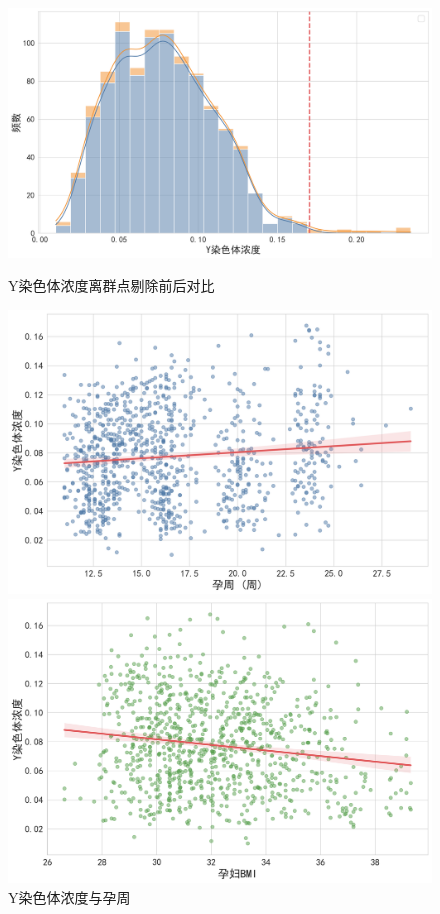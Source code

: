 \begin{figure}[h!]
	\centering
	\begin{minipage}[b]{0.48\textwidth}
		\centering
		\includegraphics[width=1\textwidth]{figs/3问题一/图1_Y浓度离群点剔除可视化.png}
		\caption{Y染色体浓度离群点剔除前后对比}
		\label{fig:Y浓度离群点剔除可视化}
	\end{minipage}
	\hfill
	\begin{minipage}[b]{0.48\textwidth}
		\centering
		\includegraphics[width=\textwidth]{figs/3问题一/图3_Y浓度_vs_孕周_散点图.png}
		\caption{Y染色体浓度与孕周}
		\label{fig:Y浓度_vs_孕周_散点图}
	\end{minipage}
	\hfill
	\begin{minipage}[b]{0.48\textwidth}
		\centering
		\includegraphics[width=\textwidth]{figs/3问题一/图4_Y浓度_vs_孕妇BMI_散点图.png}

\end{minipage}
\end{figure}
